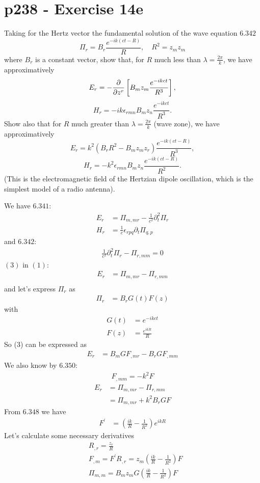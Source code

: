 \section{p238 - Exercise 14e}
\begin{tcolorbox}
Taking for the Hertz vector the fundamental solution of the wave equation $\mathbf{6.342}$
$$\Pi_r=B_r\frac{e^{-ik\left(ct-R\right)}}{R},\quad R^2=z_mz_m$$
where $B_r$ is a constant vector, show that, for $R$ much less than $\lambda=\frac{2\pi}{k}$, we have approximatively
$$E_r= -\pdv{}{z^r}\left[B_mz_m\frac{e^{-ikct}}{R^3}\right],$$
$$H_r= -ik\epsilon_{rmn}B_mz_n\frac{e^{-ikct}}{R^3}.$$
Show also that for $R$ much greater than $\lambda=\frac{2\pi}{k}$ (wave zone), we have approximatively
$$E_r= k^2\left(B_rR^2-B_mz_mz_r\right)\frac{e^{-ik(ct-R)}}{R^3},$$
$$H_r= -k^2\epsilon_{rmn}B_mz_n\frac{e^{-ik(ct-R)}}{R^2}.$$
(This is the electromagnetic field of the Hertzian dipole oscillation, which is the simplest model of a radio antenna).
\end{tcolorbox}
We have $\mathbf{6.341}$:
\begin{align}
E_r&= \Pi_{m,mr}-\frac{1}{c^2}\partial^2_t\Pi_r\\
H_r&= \frac{1}{c}\epsilon_{rpq}\partial_t\Pi_{q,p}
\end{align}
and $\mathbf{6.342}$:
\begin{align}
\frac{1}{c^2}\partial^2_t\Pi_r-\Pi_{r,mm}=0
\end{align}
$(3)$ in $(1)$:
\begin{align}
E_r&= \Pi_{m,mr}-\Pi_{r,mm}\\
\end{align}
and let's express $\Pi_r$ as 
\begin{align}
\Pi_r&= B_rG(t)F(z)
\end{align}
with
\\
\begin{align}
G(t)&=e^{-ikct}\\
F(z)&= \frac{e^{ikR}}{R}
\end{align}
So (3) can be expressed as 
\begin{align}
E_r&= B_mGF_{,mr}-B_rGF_{,mm}
\end{align}We also know by $\mathbf{6.350}$:
\begin{align}
F_{,mm}=-k^2F
\end{align}
\begin{align}
E_r&= \Pi_{m,mr}-\Pi_{r,mm}\\
&= \Pi_{m,mr}+k^2B_rGF
\end{align}
From $\mathbf{6.348}$ we have
\begin{align}
F^{'} &= \left(\frac{ik}{R}-\frac{1}{R^2}\right)e^{ikR}
\end{align}
Let's calculate some necessary derivatives
\begin{align}
&R_{,r} = \frac{z_r}{R}\\
&F_{,m} = F^{'}R_{,r}=z_m\left(\frac{ik}{R}-\frac{1}{R^2}\right)F\\
&\Pi_{m,m} = B_mz_mG\left(\frac{ik}{R}-\frac{1}{R^2}\right)F
\end{align}


